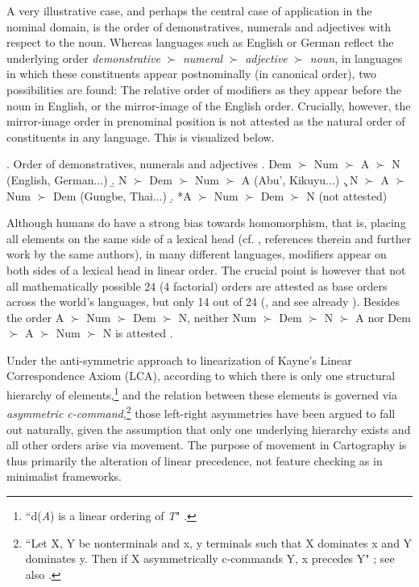 A very illustrative case, and perhaps the central case of application in the nominal domain, is the order of demonstratives, numerals and adjectives with respect to the noun. Whereas languages such as English or German reflect the underlying order \textit{demonstrative} $\succ$ \textit{numeral} $\succ$ \textit{adjective} $\succ$ \textit{noun}, in languages in which these constituents appear postnominally (in canonical order), two possibilities are found: The relative order of modifiers as they appear before the noun in English, or the mirror-image of the English order. Crucially, however, the mirror-image order in prenominal position is not attested as the natural order of constituents in any language. This is visualized below.

\ex. Order of demonstratives, numerals and adjectives \citep[166]{cinque:2009:fundamental}
\a. Dem $\succ$ Num $\succ$ A $\succ$ N (English, German...)
\b. N $\succ$ Dem $\succ$ Num $\succ$ A (Abu', Kikuyu...)
\c. N $\succ$ A $\succ$ Num $\succ$ Dem (Gungbe, Thai...)
\d. *A $\succ$ Num $\succ$ Dem $\succ$ N (not attested)

Although humans do have a strong bias towards homomorphism, that is, placing all elements on the same side of a lexical head (cf. \citealt{martin:2020:experimental}, references therein and further work by the same authors), in many different languages, modifiers appear on both sides of a lexical head in linear order. The crucial point is however that not all mathematically possible 24 (4 factorial) orders are attested as base orders across the world’s languages, but only 14 out of 24 (\citealt{cinque:2005:deriving, cinque:2023:linearization}, and see already \citealt{greenberg:1963:some, hawkins:1983:word}). Besides the order A $\succ$ Num $\succ$ Dem $\succ$ N, neither Num $\succ$ Dem $\succ$ N $\succ$ A nor Dem $\succ$ A $\succ$ Num $\succ$ N is attested \citep[319–320]{cinque:2005:deriving}.  

Under the anti-symmetric approach to linearization of Kayne’s \citeyear{kayne:1994:anti} Linear Correspondence Axiom (LCA), according to which there is only one structural hierarchy of elements,\footnote{``d(\textit{A}) is a linear ordering of \textit{T}" \citep[6]{kayne:1994:anti}.} and the relation between these elements is governed via \textit{asymmetric c-command},\footnote{``Let X, Y be nonterminals and x, y terminals such that X dominates x and Y dominates y. Then if X asymmetrically c-commands Y, x precedes Y" \citep[31]{kayne:1994:anti}; see also \citet{moro:1997:raising, moro:2000:dynamic}.} those left-right asymmetries have been argued to fall out naturally, given the assumption that only one underlying hierarchy exists and all other orders arise via movement. The purpose of movement in Cartography is thus primarily the alteration of linear precedence, not feature checking as in minimalist frameworks.

